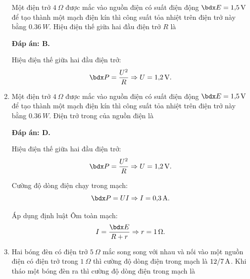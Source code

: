 \begin{enumerate}[label=\bfseries Câu \arabic*:]
	\cauhoi
	{Một điện trở $\SI{4}{\Omega}$ được mắc vào nguồn điện có suất điện động $\calE = \SI{1.5}{V}$ để tạo thành một mạch điện kín thì công suất tỏa nhiệt trên điện trở này bằng $\SI{0.36}{W}$. Hiệu điện thế giữa hai đầu điện trở $R$ là
		
	}
	\loigiai
	{	\textbf{Đáp án: B.}
		
		Hiệu điện thế giữa hai đầu điện trở:
		$$\calP = \dfrac{U^2}{R} \Rightarrow U=\SI{1.2}{V}.$$
	}
	\item {}
	
	\cauhoi
	{Một điện trở $\SI{4}{\Omega}$ được mắc vào nguồn điện có suất điện động $\calE = \SI{1.5}{V}$ để tạo thành một mạch điện kín thì công suất tỏa nhiệt trên điện trở này bằng $\SI{0.36}{W}$. Điện trở trong của nguồn điện là
		
	}
	\loigiai
	{	\textbf{Đáp án: D.}
		
		Hiệu điện thế giữa hai đầu điện trở:
		$$\calP = \dfrac{U^2}{R} \Rightarrow U=\SI{1.2}{V}.$$
		
		Cường độ dòng điện chạy trong mạch:
		$$\calP = UI \Rightarrow I=\SI{0.3}{A}.$$
		
		Áp dụng định luật Ôm toàn mạch:
		$$I=\dfrac{\calE}{R+r} \Rightarrow r = \SI{1}{\Omega}.$$
	}
	\item {}
	
	\cauhoi
	{Hai bóng đèn có điện trở $\SI{5}{\Omega}$ mắc song song với nhau và nối vào một nguồn điện có điện trở trong $\SI{1}{\Omega}$ thì cường độ dòng điện trong mạch là $\xsi{12/7}{A}$. Khi tháo một bóng đèn ra thì cường độ dòng điện trong mạch là
		
}
\end{enumerate}
